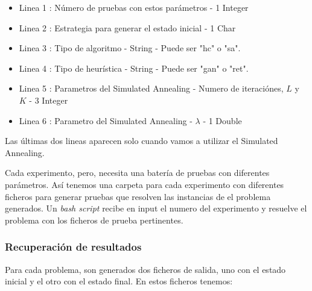 \documentclass{article}
\begin{document}
\begin{itemize}
\item Linea 1 : Número de pruebas con estos parámetros - 1 Integer
\item Linea 2 : Estrategia para generar el estado inicial - 1 Char
\item Linea 3 : Tipo de algoritmo - String - Puede ser "hc" o "sa".
\item Linea 4 : Tipo de heurística - String - Puede ser "gan" o "ret".
\item Linea 5 : Parametros del Simulated Annealing - Numero de iteraciónes,
$L$ y $K$ - 3 Integer
\item Linea 6 : Parametro del Simulated Annealing - $\lambda$ - 1 Double
\end{itemize}

Las últimas dos lineas aparecen solo cuando vamos a utilizar el Simulated
Annealing. 

Cada experimento, pero, necesita una batería de pruebas con diferentes
parámetros. Así tenemos una carpeta para cada experimento con diferentes
ficheros para generar pruebas que resolven las instancias de el problema generados. Un {\it bash script} recibe en input el numero
del experimento y resuelve el problema con los ficheros de prueba pertinentes.

\subsubsection{Recuperación de resultados}

Para cada problema, son generados dos ficheros de salida, uno con el estado
inicial y el otro con el estado final. En estos ficheros tenemos:
\end{document}
